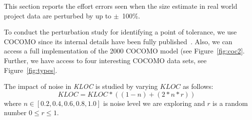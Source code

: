 \documentclass[final,twocolumn]{elsarticle}
\newcommand{\fig}[1]{Figure~\ref{fig:#1}}
\theoremstyle{break}
\begin{document}
This section reports the effort errors seen when
the size estimate in  real world project data are perturbed by
up to
$\pm$~100\%. 


To conduct the perturbation study for identifying a point of tolerance, we use
COCOMO since its internal details have been fully
published~\cite{boehm00b}. Also, we can access a full implementation of the 2000
COCOMO model (see \fig{coc2}. Further, we have access to four interesting COCOMO data sets,
see \fig{types}.

The impact of noise in \textit{KLOC} is
studied by varying $\mathit{KLOC}$ as follows:
\begin{equation}
    \label{eq:kloc}
    \mathit{KLOC} = \mathit{KLOC}*((1- n) + (2*n*r))
\end{equation}
where $n \in [0.2, 0.4, 0.6, 0.8, 1.0]$ is noise level we are exploring and $r$ is a random number
$0 \le r \le 1$. 
\end{document}
